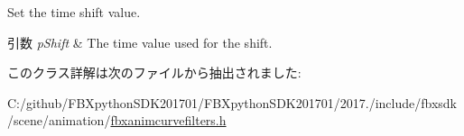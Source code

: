 Set the time shift value. 
\begin{DoxyParams}{引数}
{\em p\+Shift} & The time value used for the shift. \\
\hline
\end{DoxyParams}


このクラス詳解は次のファイルから抽出されました\+:\begin{DoxyCompactItemize}
\item 
C\+:/github/\+F\+B\+Xpython\+S\+D\+K201701/\+F\+B\+Xpython\+S\+D\+K201701/2017./include/fbxsdk/scene/animation/\hyperlink{fbxanimcurvefilters_8h}{fbxanimcurvefilters.\+h}\end{DoxyCompactItemize}
